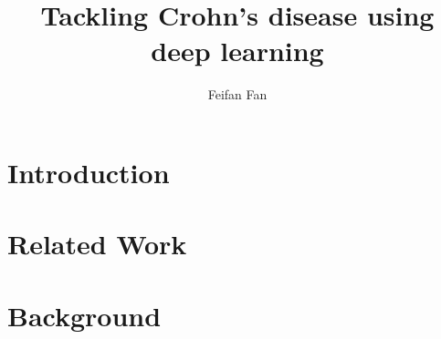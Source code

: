 \documentclass[a4paper,12pt,twoside]{report}
\begin{document}
\title{Tackling Crohn's disease using deep learning}
\author{Feifan Fan}


% 
% 

\tableofcontents

\chapter{Introduction}
\label{cha:introduction}


\chapter{Related Work}

\chapter{Background}
\label{cha:background}


% 

% 
% 

% 

% 

% 


\end{document}
